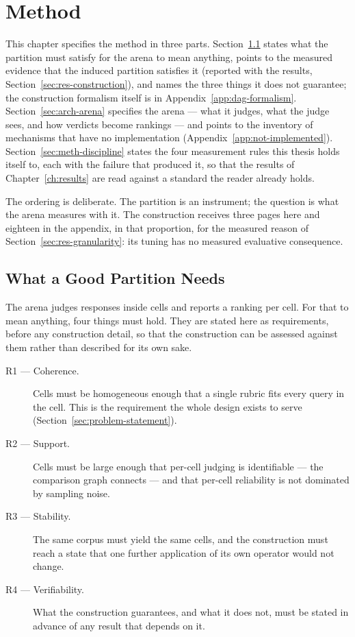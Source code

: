 
\chapter{Method}\label{ch:methodology}

This chapter specifies the method in three parts.
Section~\ref{sec:arch-requirements} states what the partition must
satisfy for the arena to mean anything, points to the measured
evidence that the induced partition satisfies it (reported with the
results, Section~\ref{sec:res-construction}), and names the three
things it does not guarantee; the construction formalism itself is in
Appendix~\ref{app:dag-formalism}.
Section~\ref{sec:arch-arena} specifies the arena --- what it judges,
what the judge sees, and how verdicts become rankings --- and points
to the inventory of mechanisms that have no implementation
(Appendix~\ref{app:not-implemented}).
Section~\ref{sec:meth-discipline} states the four measurement rules
this thesis holds itself to, each with the failure that produced it, so
that the results of Chapter~\ref{ch:results} are read against a
standard the reader already holds.

The ordering is deliberate. The partition is an instrument; the
question is what the arena measures with it. The construction receives
three pages here and eighteen in the appendix, in that proportion, for
the measured reason of Section~\ref{sec:res-granularity}: its tuning
has no measured evaluative consequence.

\section{What a Good Partition Needs}\label{sec:arch-requirements}

The arena judges responses inside cells and reports a ranking per cell.
For that to mean anything, four things must hold. They are stated here
as requirements, before any construction detail, so that the
construction can be assessed against them rather than described for its
own sake.

\begin{description}
\item[R1 --- Coherence.] Cells must be homogeneous enough that a single
rubric fits every query in the cell. This is the requirement the whole
design exists to serve (Section~\ref{sec:problem-statement}).
\item[R2 --- Support.] Cells must be large enough that per-cell judging
is identifiable --- the comparison graph connects --- and that per-cell
reliability is not dominated by sampling noise.
\item[R3 --- Stability.] The same corpus must yield the same cells, and
the construction must reach a state that one further application of its
own operator would not change.
\item[R4 --- Verifiability.] What the construction guarantees, and what
it does not, must be stated in advance of any result that depends on
it.
\end{description}

